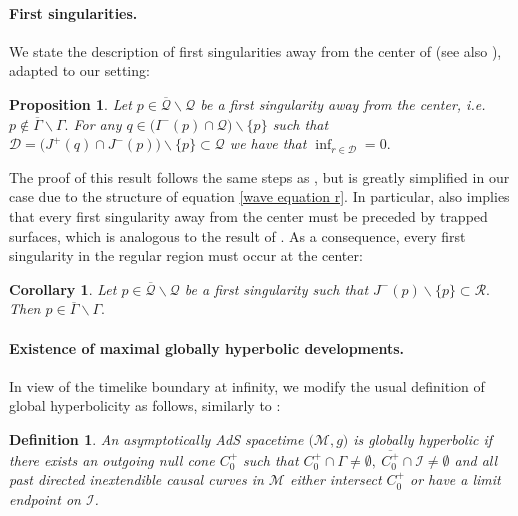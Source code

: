 \documentclass[11pt]{article}
\newtheorem{definition}{Definition}[section]
\newtheorem{corollary}{Corollary}[section]
\newtheorem{proposition}{Proposition}[section]
\numberwithin{equation}{section}
\begin{document}
\paragraph{First singularities.} We state the description of first singularities away from the center of \cite[Theorem 1.8]{kommemi} (see also \cite[Proposition A.1]{localwellposed}), adapted to our setting:

\begin{proposition}\label{extension principle away from center}
    Let $p\in\overline{\mathcal{Q}}\backslash\mathcal{Q}$ be a first singularity away from the center, i.e. $p\notin\overline{\Gamma}\backslash\Gamma.$ For any $q\in\big(I^-(p)\cap\mathcal{Q}\big)\backslash\{p\}$ such that $\mathcal{D}=\big(J^+(q)\cap J^-(p)\big)\backslash\{p\}\subset\mathcal{Q}$ we have that $\inf_{r\in\mathcal{D}}=0.$
\end{proposition}
The proof of this result follows the same steps as \cite[Theorem 1.8]{kommemi}, but is greatly simplified in our case due to the structure of equation \eqref{wave equation r}. In particular,  also implies that every first singularity away from the center must be preceded by trapped surfaces, which is analogous to the result of \cite{Dafermos_extension}. As a consequence, every first singularity in the regular region must occur at the center:
\begin{corollary}\label{first singularities at the center corollary}
    Let $p\in\overline{\mathcal{Q}}\backslash\mathcal{Q}$ be a first singularity such that $J^-(p)\backslash\{p\}\subset\mathcal{R}.$ Then $p\in\overline{\Gamma}\backslash\Gamma.$
\end{corollary}

\paragraph{Existence of maximal globally hyperbolic developments.} In view of the timelike boundary at infinity, we modify the usual definition of global hyperbolicity as follows, similarly to \cite[Definition~8.1]{localwellposed}: 
\begin{definition}
    An asymptotically AdS spacetime $\big(\mathcal{M},g\big)$ is globally hyperbolic if there exists an outgoing null cone $C_0^+$ such that $C_0^+\cap\Gamma\neq\emptyset,\ \overline{C_0^+}\cap\mathcal{I}\neq\emptyset$ and all past directed inextendible causal curves in $\mathcal{M}$ either intersect $C_0^+$ or have a limit endpoint on $\mathcal{I}$.
\end{definition}
\end{document}
